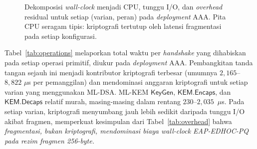 \documentclass{easychair}
\newcommand{\KemKeyGen}{\mathsf{KeyGen}}
\newcommand{\Encaps}{\mathsf{KEM.Encaps}}
\newcommand{\Decaps}{\mathsf{KEM.Decaps}}
\begin{document}
\begin{figure}[H]
\centering
{}
\caption{Dekomposisi \emph{wall-clock} menjadi CPU, tunggu I/O, dan
\emph{overhead} residual untuk setiap (varian, peran) pada
\emph{deployment} AAA. Pita CPU seragam tipis: kriptografi tertutup
oleh latensi fragmentasi pada setiap konfigurasi.}
\label{fig:overhead-stacked}
\end{figure}
\FloatBarrier
Tabel~\ref{tab:operations} melaporkan total waktu per \emph{handshake}
yang dihabiskan pada setiap operasi primitif, diukur pada
\emph{deployment} AAA. Pembangkitan tanda tangan sejauh ini
menjadi kontributor kriptografi terbesar (umumnya $2{,}165$--$8{,}822$
$\mu$s per pemanggilan) dan mendominasi anggaran kriptografi untuk
setiap varian yang menggunakan ML-DSA. ML-KEM $\KemKeyGen$, $\Encaps$,
dan $\Decaps$ relatif murah, masing-masing dalam rentang
$230$--$2{,}035$~$\mu$s. Pada setiap varian, kriptografi menyumbang
jauh lebih sedikit daripada tunggu I/O akibat fragmen, memperkuat
kesimpulan dari Tabel~\ref{tab:overhead} bahwa \emph{fragmentasi,
bukan kriptografi, mendominasi biaya \emph{wall-clock} EAP-EDHOC-PQ
pada rezim fragmen 256-\emph{byte}.}
\end{document}
